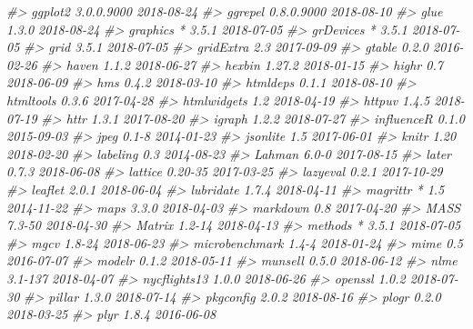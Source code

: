 \documentclass[]{book}
\newenvironment{Shaded}{\begin{snugshade}}{\end{snugshade}}
\newcommand{\CommentTok}[1]{\textcolor[rgb]{0.56,0.35,0.01}{\textit{#1}}}
\theoremstyle{plain}
\theoremstyle{remark}
\begin{document}
\begin{Shaded}
\begin{Highlighting}[]
\CommentTok{#>  ggplot2          3.0.0.9000 2018-08-24}
\CommentTok{#>  ggrepel          0.8.0.9000 2018-08-10}
\CommentTok{#>  glue             1.3.0      2018-08-24}
\CommentTok{#>  graphics       * 3.5.1      2018-07-05}
\CommentTok{#>  grDevices      * 3.5.1      2018-07-05}
\CommentTok{#>  grid             3.5.1      2018-07-05}
\CommentTok{#>  gridExtra        2.3        2017-09-09}
\CommentTok{#>  gtable           0.2.0      2016-02-26}
\CommentTok{#>  haven            1.1.2      2018-06-27}
\CommentTok{#>  hexbin           1.27.2     2018-01-15}
\CommentTok{#>  highr            0.7        2018-06-09}
\CommentTok{#>  hms              0.4.2      2018-03-10}
\CommentTok{#>  htmldeps         0.1.1      2018-08-10}
\CommentTok{#>  htmltools        0.3.6      2017-04-28}
\CommentTok{#>  htmlwidgets      1.2        2018-04-19}
\CommentTok{#>  httpuv           1.4.5      2018-07-19}
\CommentTok{#>  httr             1.3.1      2017-08-20}
\CommentTok{#>  igraph           1.2.2      2018-07-27}
\CommentTok{#>  influenceR       0.1.0      2015-09-03}
\CommentTok{#>  jpeg             0.1-8      2014-01-23}
\CommentTok{#>  jsonlite         1.5        2017-06-01}
\CommentTok{#>  knitr            1.20       2018-02-20}
\CommentTok{#>  labeling         0.3        2014-08-23}
\CommentTok{#>  Lahman           6.0-0      2017-08-15}
\CommentTok{#>  later            0.7.3      2018-06-08}
\CommentTok{#>  lattice          0.20-35    2017-03-25}
\CommentTok{#>  lazyeval         0.2.1      2017-10-29}
\CommentTok{#>  leaflet          2.0.1      2018-06-04}
\CommentTok{#>  lubridate        1.7.4      2018-04-11}
\CommentTok{#>  magrittr       * 1.5        2014-11-22}
\CommentTok{#>  maps             3.3.0      2018-04-03}
\CommentTok{#>  markdown         0.8        2017-04-20}
\CommentTok{#>  MASS             7.3-50     2018-04-30}
\CommentTok{#>  Matrix           1.2-14     2018-04-13}
\CommentTok{#>  methods        * 3.5.1      2018-07-05}
\CommentTok{#>  mgcv             1.8-24     2018-06-23}
\CommentTok{#>  microbenchmark   1.4-4      2018-01-24}
\CommentTok{#>  mime             0.5        2016-07-07}
\CommentTok{#>  modelr           0.1.2      2018-05-11}
\CommentTok{#>  munsell          0.5.0      2018-06-12}
\CommentTok{#>  nlme             3.1-137    2018-04-07}
\CommentTok{#>  nycflights13     1.0.0      2018-06-26}
\CommentTok{#>  openssl          1.0.2      2018-07-30}
\CommentTok{#>  pillar           1.3.0      2018-07-14}
\CommentTok{#>  pkgconfig        2.0.2      2018-08-16}
\CommentTok{#>  plogr            0.2.0      2018-03-25}
\CommentTok{#>  plyr             1.8.4      2016-06-08}

\end{Highlighting}
\end{Shaded}
\end{document}
